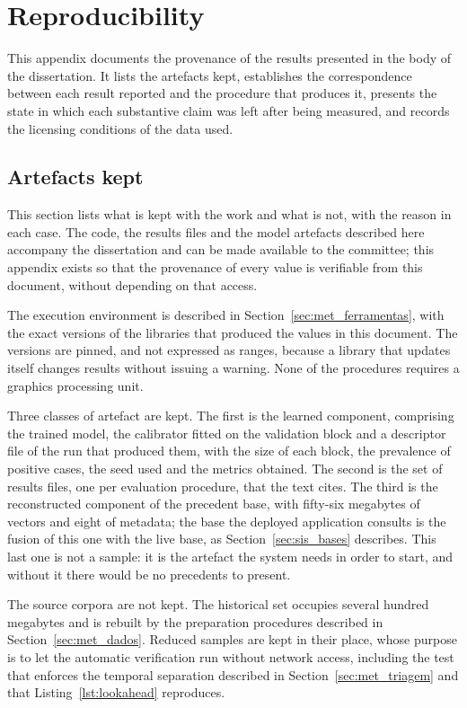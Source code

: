 \chapter{Reproducibility}
\label{ap:reprodutibilidade}

This appendix documents the provenance of the results presented in the body of the dissertation. It
lists the artefacts kept, establishes the correspondence between each result reported and the
procedure that produces it, presents the state in which each substantive claim was left after being
measured, and records the licensing conditions of the data used.

\section{Artefacts kept}
\label{sec:ap_artefactos}

This section lists what is kept with the work and what is not, with the reason in each case. The
code, the results files and the model artefacts described here accompany the dissertation and can
be made available to the committee; this appendix exists so that the provenance of every value is
verifiable from this document, without depending on that access.

The execution environment is described in Section~\ref{sec:met_ferramentas}, with the exact
versions of the libraries that produced the values in this document. The versions are pinned, and
not expressed as ranges, because a library that updates itself changes results without issuing a
warning. None of the procedures requires a graphics processing unit.

Three classes of artefact are kept. The first is the learned component, comprising the trained
model, the calibrator fitted on the validation block and a descriptor file of the run that produced
them, with the size of each block, the prevalence of positive cases, the seed used and the metrics
obtained. The second is the set of results files, one per evaluation procedure, that the text
cites. The third is the reconstructed component of the precedent base, with fifty-six megabytes
of vectors and eight of metadata; the base the deployed application consults is the fusion of
this one with the live base, as Section~\ref{sec:sis_bases} describes. This last one is
not a sample: it is the artefact the system needs
in order to start, and without it there would be no precedents to present.

The source corpora are not kept. The historical set occupies several hundred megabytes and is
rebuilt by the preparation procedures described in Section~\ref{sec:met_dados}. Reduced samples are
kept in their place, whose purpose is to let the automatic verification run without network access,
including the test that enforces the temporal separation described in
Section~\ref{sec:met_triagem} and that Listing~\ref{lst:lookahead} reproduces.

